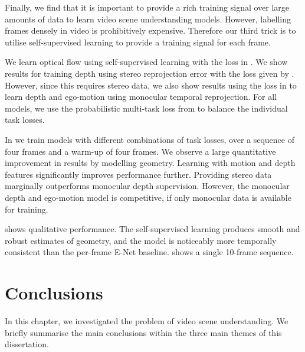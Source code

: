 Finally, we find that it is important to provide a rich training signal over large amounts of data to learn video scene understanding models. However, labelling frames densely in video is prohibitively expensive. Therefore our third trick is to utilise self-supervised learning to provide a training signal for each frame.

We learn optical flow using self-supervised learning with the loss in . We show results for training depth using stereo reprojection error with the loss given by . However, since this requires stereo data, we also show results using the loss in  to learn depth and ego-motion using monocular temporal reprojection. For all models, we use the probabilistic multi-task loss from \citep{kendall2017multi} to balance the individual task losses.

In  we train models with different combinations of task losses, over a sequence of four frames and a warm-up of four frames. We observe a large quantitative improvement in results by modelling geometry. Learning with motion and depth features significantly improves performance further. Providing stereo data marginally outperforms monocular depth supervision. However, the monocular depth and ego-motion model is competitive, if only monocular data is available for training. 

 shows qualitative performance. The self-supervised learning produces smooth and robust estimates of geometry, and the model is noticeably more temporally consistent than the per-frame E-Net baseline.  shows a single 10-frame sequence.


\section{Conclusions}

In this chapter, we investigated the problem of video scene understanding. We briefly summarise the main conclusions within the three main themes of this dissertation.

